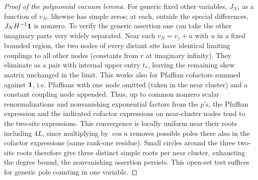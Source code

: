 \begin{proof}[Proof of the polynomial vacuum lemma]
For generic fixed other variables, \(J_N\), as a function of \(v_N\), likewise has simple zeros; at each, outside the special differences, \(J_N H^{-1}{\bf1}\) is nonzero. To verify the generic assertion one can take the other imaginary parts very widely separated. Near each \(v_N=v_j+u\) with \(u\) in a fixed bounded region, the two nodes of every distant site have identical limiting couplings to all other nodes (constants from \(r\) at imaginary infinity). They eliminate as a pair with internal upper entry \(t_*\), leaving the remaining skew matrix unchanged in the limit. This works also for Pfaffian cofactors summed against \({\bf1}\), i.e. Pfaffians with one node omitted (taken in the near cluster) and a constant coupling node appended. Thus, up to common nonzero scalar renormalizations and nonvanishing exponential factors from the \(p\)'s, the Pfaffian expression and the indicated cofactor expressions on near-cluster nodes tend to the two-site expressions. This convergence is locally uniform near their roots including \(4L\), since multiplying by \(\cos u\) removes possible poles there also in the cofactor expressions (same rank-one residue). Small circles around the three two-site roots therefore give three distinct simple roots per near cluster, exhausting the degree bound; the nonvanishing assertion persists. This open-set test suffices for generic pole counting in one variable.


\end{proof}
